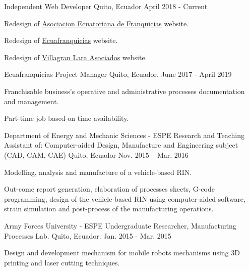 
\begin{cventries}

  \cventry
    {Independent}
    {Web Developer}
    {Quito, Ecuador}
    {April 2018 - Current}
    {
      \begin{cvitems}
        \item {Redesign of \href{https://aefran.org}{Asociacion Ecuatoriana de Franquicias} website.}
        \item {Redesign of \href{http://www.ecuafranquicias.com}{Ecuafranquicias} website.}
        \item {Redesign of \href{http://www.villagranlara.com}{Villagran Lara Asociados} website.}                       
      \end{cvitems} 
    }
    
  \cventry
    {Ecuafranquicias}
    {Project Manager}
    {Quito, Ecuador.}
    {June 2017 - April 2019}
    {
      \begin{cvitems}
        \item {Franchisable business's operative and administrative processes documentation and management.}
        \item {Part-time job based-on time availability.}
      \end{cvitems}
    }

  \cventry
    {Department of Energy and Mechanic Sciences - ESPE}
    {Research and Teaching Assistant of: Computer-aided Design, Manufacture and Engineering subject (CAD, CAM, CAE)	}
    {Quito, Ecuador}
    {Nov. 2015 – Mar. 2016}
    {
      \begin{cvitems}
        \item {Modelling, analysis and manufacture of a vehicle-based RIN. }
        \item {Out-come report generation, elaboration of processes sheets, G-code programming, design of the vehicle-based RIN using computer-aided software, strain simulation and post-process of the manufacturing operations.}
      \end{cvitems}
    }
  
  \cventry
    {Army Forces University - ESPE}
    {Undergraduate Researcher, Manufacturing Processes Lab.}
    {Quito, Ecuador.}
    {Jan. 2015 - Mar. 2015}
    {
      \begin{cvitems}
        \item {Design and development mechanism for mobile robots mechanisms using 3D printing and laser cutting techniques.}
      \end{cvitems}
    }
        
\end{cventries}
